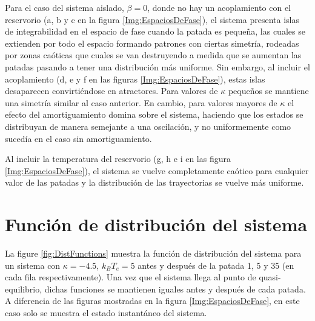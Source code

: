 \documentclass[letterpaper,12pt,oneside]{book}
\begin{document}
Para el caso del sistema aislado, $\beta=0$, donde no hay un acoplamiento con el reservorio (a, b y c en la figura \ref{Img:EspaciosDeFase}), el sistema presenta islas de integrabilidad en el espacio de fase cuando la patada es pequeña, las cuales se extienden por todo el espacio formando patrones con ciertas simetría, rodeadas por zonas caóticas que cuales se van destruyendo a medida que se aumentan las patadas pasando a tener una distribución m\'as uniforme. Sin embargo, al incluir el acoplamiento (d, e y f en las figuras \ref{Img:EspaciosDeFase}), estas islas desaparecen convirtiéndose en atractores. Para valores de $\kappa$ pequeños se mantiene una simetría similar al caso anterior. En cambio, para valores mayores de $\kappa$ el efecto del amortiguamiento domina sobre el sistema, haciendo que los estados se distribuyan de manera semejante a una oscilación, y no uniformemente como sucedía en el caso sin amortiguamiento.

Al incluir la temperatura del reservorio (g, h e i en las figura \ref{Img:EspaciosDeFase}), el sistema se vuelve completamente caótico para cualquier valor de las patadas y la distribución de las trayectorias se vuelve más uniforme.




\section{Funci\'on de distribuci\'on del sistema}

La figure {\ref{fig:DistFunctions}} muestra la funci\'on de distribuci\'on del sistema para un sistema con $\kappa=-4.5$, $k_BT_e = 5$ antes y despu\'es de la patada 1, 5 y 35 (en cada fila respectivamente). Una vez que el sistema llega al punto de quasi-equilibrio, dichas funciones se mantienen iguales antes y despu\'es de cada patada. A diferencia de las figuras mostradas en la figura \ref{Img:EspaciosDeFase}, en este caso solo se muestra el estado instant\'aneo del sistema. 
\end{document}

